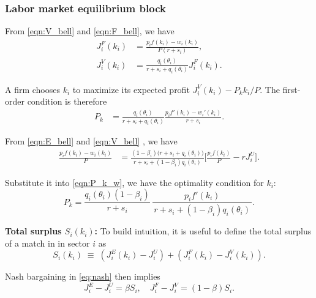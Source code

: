 \documentclass[12pt]{article} %
\theoremstyle{definition}
\begin{document}
\subsubsection{Labor market equilibrium block}


From \eqref{eqn:V_bell} and \eqref{eqn:F_bell}, we have
\begin{align}
    J_i^F(k_i) &=   \frac{p_i f(k_i)-w_i(k_i)}{P(r+s_i)},\\
    J_i^V(k_i) & =   \frac{q_i(\theta_i)}{r+s_i+q_i(\theta_i)}J_i^F(k_i).  \label{eq:JV_int1}
\end{align}

A firm chooses $k_i$ to maximize its expected profit $J^V_i(k_i)- P_kk_i/P$.  The first-order condition is therefore
\begin{align}
        P_k &= \frac{q_i(\theta_i)}{r+s_i+q_i(\theta_i)} \frac{p_i f'(k_i) - w_i'(k_i)}{r+s_i}.  \label{eqn:P_k_w}
\end{align}


From  \eqref{eqn:E_bell} and  \eqref{eqn:V_bell} , we have
\begin{align}
    \frac{p_i f(k_i)-w_i(k_i) }{P}
    & = \frac{(1-\beta_i)\big(r+s_i+q_i(\theta_i)\big)}{\,r+s_i+(1-\beta_i)q_i(\theta_i)\,}\big[\frac{p_i f(k_i)}{P}-rJ_i^U\big].
\end{align}

Substitute it into \eqref{eqn:P_k_w}, we have the optimality condition for $k_i$:
\begin{equation*}
     P_k  = \frac{q_i(\theta_i)(1-\beta_i)}{r+s_i}\,\frac{p_i f'(k_i)}{\,r+s_i+(1-\beta_i)q_i(\theta_i)\,}.
\end{equation*}

\noindent \textbf{Total surplus $S_i(k_i)$:} To build intuition, it is useful to define the total surplus of a match in 
in sector $i$ as
\[
S_i(k_i) \;\equiv\; (J_i^E(k_i)-J_i^U) + (J_i^F(k_i)-J_i^V(k_i)).
\]

Nash bargaining in \eqref{eq:nash} then implies
\begin{equation} \label{partial_surplus}
    J^E_i-J^U_i = \beta S_i, \quad J^F_i-J^V_i = (1-\beta)S_i .
\end{equation}
\end{document}
